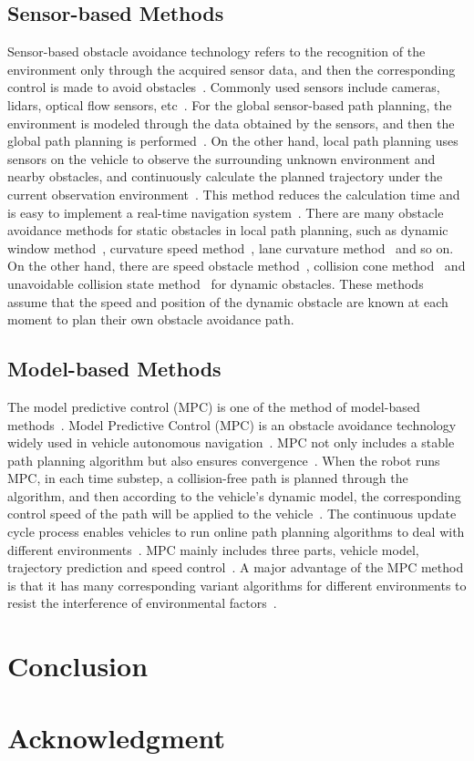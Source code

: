 \documentclass[conference]{IEEEtran}
\begin{document}
\subsection{Sensor-based Methods}
Sensor-based obstacle avoidance technology refers to the recognition of the environment only through the acquired sensor data, and then the corresponding control is made to avoid obstacles~\cite{self_driving}. Commonly used sensors include cameras, lidars, optical flow sensors, etc~\cite{self_driving}. For the global sensor-based path planning, the environment is modeled through the data obtained by the sensors, and then the global path planning is performed~\cite{self_driving}. On the other hand, local path planning uses sensors on the vehicle to observe the surrounding unknown environment and nearby obstacles, and continuously calculate the planned trajectory under the current observation environment~\cite{self_driving}. This method reduces the calculation time and is easy to implement a real-time navigation system~\cite{self_driving}. There are many obstacle avoidance methods for static obstacles in local path planning, such as dynamic window method~\cite{fox1997dynamic}, curvature speed method~\cite{simmons1996curvature}, lane curvature method~\cite{ko1998lane} and so on. On the other hand, there are speed obstacle method~\cite{fiorini1998motion}, collision cone method~\cite{chakravarthy1998obstacle} and unavoidable collision state method~\cite{fraichard2004inevitable} for dynamic obstacles. These methods assume that the speed and position of the dynamic obstacle are known at each moment to plan their own obstacle avoidance path.

\subsection{Model-based Methods}
The model predictive control (MPC) is one of the method of model-based methods~\cite{Brian2016}. Model Predictive Control (MPC) is an obstacle avoidance technology widely used in vehicle autonomous navigation~\cite{mayne2003model}. MPC not only includes a stable path planning algorithm but also ensures convergence~\cite{mayne2003model}. When the robot runs MPC, in each time substep, a collision-free path is planned through the algorithm, and then according to the vehicle's dynamic model, the corresponding control speed of the path will be applied to the vehicle~\cite{mayne2003model}. The continuous update cycle process enables vehicles to run online path planning algorithms to deal with different environments~\cite{mayne2003model}. MPC mainly includes three parts, vehicle model, trajectory prediction and speed control~\cite{mayne2003model}. A major advantage of the MPC method is that it has many corresponding variant algorithms for different environments to resist the interference of environmental factors~\cite{mayne2003model}.

\section{Conclusion}


\section*{Acknowledgment}



 
\end{document}
